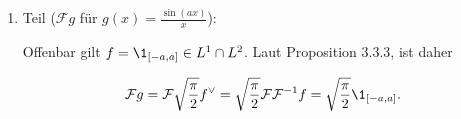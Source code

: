 \begin{solution}
\begin{enumerate}[label = \arabic*.]
    \item Teil ($\mathcal{F} g$ für $g(x) = \frac{\sin(a x)}{x}$):


    Offenbar gilt $f = \1_{[-a, a]} \in L^1 \cap L^2$.
    Laut Proposition 3.3.3, ist daher

    \begin{align*}
        \mathcal{F} g
        =
        \mathcal{F} \sqrt \frac{\pi}{2} f^\vee
        =
        \sqrt \frac{\pi}{2} \mathcal{F} \mathcal{F}^{-1} f
        =
        \sqrt \frac{\pi}{2} \1_{[-a, a]}.
    \end{align*}

\end{enumerate}

\end{solution}

